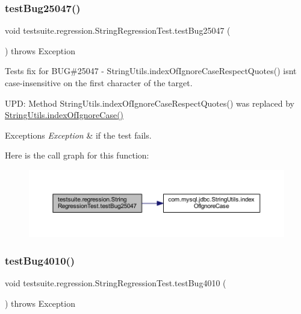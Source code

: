 \subsubsection{\texorpdfstring{test\+Bug25047()}{testBug25047()}}
{\footnotesize\ttfamily void testsuite.\+regression.\+String\+Regression\+Test.\+test\+Bug25047 (\begin{DoxyParamCaption}{ }\end{DoxyParamCaption}) throws Exception}

Tests fix for B\+UG\#25047 -\/ String\+Utils.\+index\+Of\+Ignore\+Case\+Respect\+Quotes() isn\textquotesingle{}t case-\/insensitive on the first character of the target.

U\+PD\+: Method String\+Utils.\+index\+Of\+Ignore\+Case\+Respect\+Quotes() was replaced by \mbox{\hyperlink{classcom_1_1mysql_1_1jdbc_1_1_string_utils_a6d53939d6e9719bdac7d843213d387c8}{String\+Utils.\+index\+Of\+Ignore\+Case()}}


\begin{DoxyExceptions}{Exceptions}
{\em Exception} & if the test fails. \\
\hline
\end{DoxyExceptions}
Here is the call graph for this function\+:
\nopagebreak
\begin{figure}[H]
\begin{center}
\leavevmode
\includegraphics[width=350pt]{classtestsuite_1_1regression_1_1_string_regression_test_a310d7878e44bc9bf13daa040be2bb847_cgraph}
\end{center}
\end{figure}
\mbox{\label{classtestsuite_1_1regression_1_1_string_regression_test_aab8671e0e1b8917318be7da4af2acfd5}} 
\subsubsection{\texorpdfstring{test\+Bug4010()}{testBug4010()}}
{\footnotesize\ttfamily void testsuite.\+regression.\+String\+Regression\+Test.\+test\+Bug4010 (\begin{DoxyParamCaption}{ }\end{DoxyParamCaption}) throws Exception}

